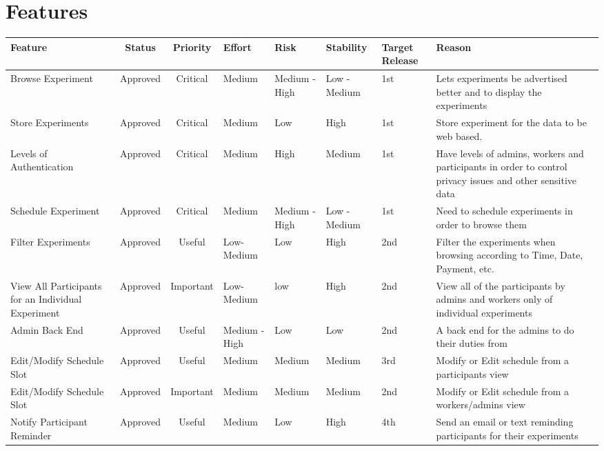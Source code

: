 \section{Features}
\begin{table}[!h]\footnotesize
    \begin{tabular}{|p{2.5cm}|c|c|p{1.25cm}|p{1cm}|p{1.25cm}|p{1cm}|p{3.75cm}|}
        \hline
        Feature & Status & Priority & Effort & Risk & Stability & Target Release & Reason \\
        \hline
        Browse Experiment & Approved & Critical & Medium & Medium - High & Low - Medium & 1st & Lets experiments be advertised better and to display the experiments \\
        \hline
        Store Experiments & Approved & Critical & Medium & Low & High & 1st & Store experiment for the data to be web based. \\
        \hline
        Levels of Authentication & Approved & Critical & Medium & High & Medium & 1st & Have levels of admins, workers and participants in order to control privacy issues and other sensitive data \\
        \hline
        Schedule Experiment & Approved & Critical & Medium & Medium - High & Low - Medium & 1st & Need to schedule experiments in order to browse them \\
        \hline
        Filter Experiments & Approved & Useful & Low-Medium & Low  & High & 2nd & Filter the experiments when browsing according to Time, Date, Payment, etc. \\
        \hline
        View All Participants for an Individual Experiment & Approved & Important & Low-Medium & low  & High & 2nd & View all of the participants by admins and workers only of individual experiments \\
        \hline
        Admin Back End & Approved & Useful & Medium - High & Low & Low & 2nd & A back end for the admins to do their duties from \\
        \hline
        Edit/Modify Schedule Slot & Approved & Useful & Medium & Medium & Medium & 3rd & Modify or Edit schedule from a participants view \\
        \hline
        Edit/Modify Schedule Slot & Approved & Important & Medium & Medium & Medium & 2nd & Modify or Edit schedule from a workers/admins view \\
        \hline
        Notify Participant Reminder & Approved & Useful & Medium & Low & High & 4th & Send an email or text reminding participants for their experiments \\

\end{tabular}
\end{table}
